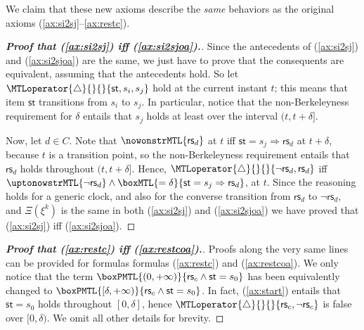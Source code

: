 \documentclass[a4paper]{article}
\newcommand{\frf}[1]{(\ref{#1})}
\newcommand{\fsrf}[2]{(\ref{#1}--\ref{#2})}
\newcommand{\st}{\mathsf{st}}
\newcommand{\rest}[1]{\mathsf{rs}_{#1}}
\newcommand{\becomesMTL}[1]{\MTLoperator{\triangle}{}{}{#1}}
\theoremstyle{plain}
\theoremstyle{definition}
\begin{document}
We claim that these new axioms describe the \emph{same} behaviors as the original axioms \fsrf{ax:si2sj}{ax:restc}.

\begin{proof}[\textbf{Proof that \frf{ax:si2sj} iff \frf{ax:si2sjoa}.}]
Since the antecedents of \frf{ax:si2sj} and \frf{ax:si2sjoa} are the same, we just have to prove that the consequents are equivalent, assuming that the antecedents hold.
So let $\becomesMTL{\st, s_i, s_j}$ hold at the current instant $t$; this means that item $\st$ transitions from $s_i$ to $s_j$.
In particular, notice that the non-Berkeleyness requirement for $\delta$ entails that $s_j$ holds at least over the interval $(t, t+\delta]$.

Now, let $d \in C$.
Note that $\nowonstrMTL{\rest{d}}$ at $t$ iff $\st = s_j \Rightarrow \rest{d}$ at $t+\delta$, because $t$ is a transition point, so the non-Berkeleyness requirement entails that $\rest{d}$ holds throughout $(t, t+\delta]$.
Hence, $\becomesMTL{\neg \rest{d}, \rest{d}}$ iff $\uptonowstrMTL{\neg \rest{d}} \wedge \boxMTL{=\delta}{\st = s_j \Rightarrow \rest{d}}$, at $t$.
Since the reasoning holds for a generic clock, and also for the converse transition from $\rest{d}$ to $\neg \rest{d}$, and $\Xi(\xi^k)$ is the same in both \frf{ax:si2sj} and \frf{ax:si2sjoa} we have proved that \frf{ax:si2sj} iff \frf{ax:si2sjoa}.
\end{proof}



\begin{proof}[\textbf{Proof that \frf{ax:restc} iff \frf{ax:restcoa}.}]
Proofs along the very same lines can be provided for formulas formulas \frf{ax:restc} and \frf{ax:restcoa}.
We only notice that the term $\boxPMTL{(0, +\infty)}{\rest{c} \wedge \st = s_0}$ has been equivalently changed to $\boxPMTL{[\delta, +\infty)}{\rest{c} \wedge \st = s_0}$.
In fact, \frf{ax:start} entails that $\st = s_0$ holds throughout $[0,\delta]$, hence $\becomesMTL{\rest{c}, \neg \rest{c}}$ is false over $[0,\delta)$.
We omit all other details for brevity.
\end{proof}
\end{document}
